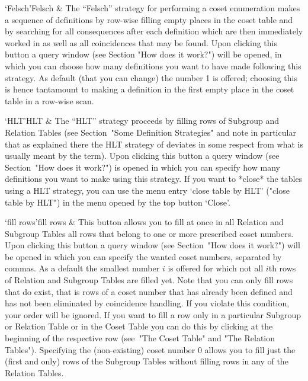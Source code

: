 \beginitems

\>`Felsch'{Felsch} &
  The ``Felsch'' strategy for performing a coset enumeration makes a
  sequence of definitions by row-wise filling empty places in the coset
  table and by searching for all consequences after each definition
  which are then immediately worked in as well as all coincidences that
  may be found. Upon clicking this button a query window (see Section
  "How does it work?") will be opened, in which you can choose how many
  definitions you want to have made following this strategy. As default
  (that you can change) the number 1 is offered; choosing this is
  hence tantamount to making a definition in the first empty place in
  the coset table in a row-wise scan.

\>`HLT'{HLT} &
  The ``HLT'' strategy proceeds by filling rows of Subgroup and Relation
  Tables (see Section~"Some Definition Strategies" and note in
  particular that as explained there the HLT strategy of {\ITC} deviates
  in some respect from what is usually meant by the term). Upon
  clicking this button a query window (see Section~"How does it work?")
  is opened in which you can specify how many definitions you want to
  make using this strategy. If you want to *close* the tables using a
  HLT strategy, you can use the menu entry `close table by HLT' ("close
  table by HLT") in the menu opened by the top button `Close'.

\>`fill rows'{fill rows} &
  This button allows you to fill at once in all Relation and Subgroup
  Tables all rows that belong to one or more prescribed coset numbers.
  Upon clicking this button a query window (see Section~"How does it
  work?") will be opened in which you can specify the wanted coset
  numbers, separated by commas. As a default the smallest number $i$ is
  offered for which not all $i$th rows of Relation and Subgroup Tables
  are filled yet. Note that you can only fill rows that do exist, that
  is rows of a coset number that has already been defined and has not
  been eliminated by coincidence handling. If you violate this
  condition, your order will be ignored. If you want to fill a row only
  in a particular Subgroup or Relation Table or in the Coset Table you
  can do this by clicking at the beginning of the respective row
  (see~"The Coset Table" and "The Relation Tables"). Specifying the
  (non-existing) coset number 0 allows you to fill just the (first and
  only) rows of the Subgroup Tables without filling rows in any of the
  Relation Tables.

